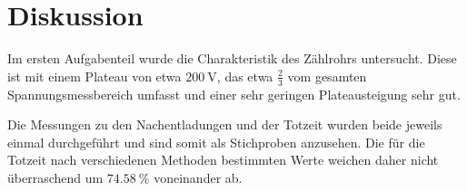 \section{Diskussion}
\label{sec:Diskussion}

Im ersten Aufgabenteil wurde die Charakteristik des Zählrohrs untersucht.
Diese ist mit einem Plateau von etwa $\SI{200}{\volt}$, das etwa $\frac{2}{3}$
vom gesamten Spannungsmessbereich umfasst und einer sehr geringen Plateausteigung
sehr gut.

Die Messungen zu den Nachentladungen und der Totzeit wurden beide jeweils einmal
durchgeführt und sind somit als Stichproben anzusehen.
Die für die Totzeit nach verschiedenen Methoden bestimmten Werte weichen
daher nicht überraschend um $\SI{74.58}{\percent}$ voneinander ab.

